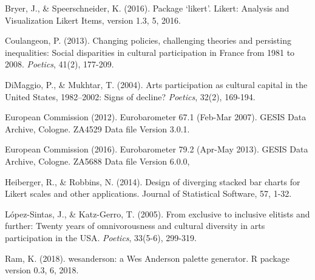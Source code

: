 \documentclass{article}
\begin{document}
Bryer, J., \& Speerschneider, K. (2016). Package ‘likert’. Likert: Analysis and Visualization Likert Items, version 1.3, 5, 2016.

Coulangeon, P. (2013). Changing policies, challenging theories and persisting inequalities: Social disparities in cultural participation in France from 1981 to 2008. \textit{Poetics}, 41(2), 177-209.

DiMaggio, P., \& Mukhtar, T. (2004). Arts participation as cultural capital in the United States, 1982–2002: Signs of decline? \textit{Poetics}, 32(2), 169-194.

European Commission (2012). Eurobarometer 67.1 (Feb-Mar 2007). GESIS Data Archive, Cologne. ZA4529 Data file Version 3.0.1. 

European Commission (2016). Eurobarometer 79.2 (Apr-May 2013). GESIS Data Archive, Cologne. ZA5688 Data file Version 6.0.0, 

Heiberger, R., \& Robbins, N. (2014). Design of diverging stacked bar charts for Likert scales and other applications. Journal of Statistical Software, 57, 1-32.

López-Sintas, J., \& Katz-Gerro, T. (2005). From exclusive to inclusive elitists and further: Twenty years of omnivorousness and cultural diversity in arts participation in the USA. \textit{Poetics}, 33(5-6), 299-319.

Ram, K. (2018). wesanderson: a Wes Anderson palette generator. R package version 0.3, 6, 2018.
\end{document}
